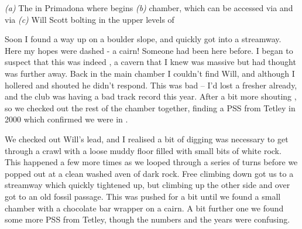 \begin{pagefigure}
	\checkoddpage \ifoddpage \forcerectofloat \else \forceversofloat \fi
	\centering
	
   	\begin{subfigure}[t]{0.49\textwidth}
    	\centering
       	\caption{} \label{The spiral climb}
    \end{subfigure}
    \hfill
	\begin{subfigure}[t]{0.49\textwidth}
		\centering
		 \caption{}\label{Alkatraz}
	\end{subfigure}
    \vspace{0cm}
	
	\begin{subfigure}[h]{\textwidth}
		\centering
		\caption{}\label{WS bolting}
	\end{subfigure}

         \caption{
   		\emph{(a)} The \protect{} in Primadona where \protect{} begins
     		\emph{(b)} \protect{} chamber, which can be accessed via \protect{} and \protect{} via \protect{}
     		\emph{(c)} Will Scott bolting in the upper levels of \protect{} 
		}
\end{pagefigure}

Soon I found a way up on a boulder slope, and quickly got into a streamway. Here my hopes were dashed - a cairn! Someone had been here before. I began to suspect that this was indeed , a cavern that I knew was massive but had thought was further away. Back in the main chamber I couldn't find Will, and although I hollered and shouted he didn't respond. This was bad -- I'd lost a fresher already, and the club was having a bad track record this year. After a bit more shouting , so we checked out the rest of the chamber together, finding a PSS from Tetley in 2000 which confirmed we were in .

We checked out Will's lead, and I realised a bit of digging was necessary to get through a crawl with a loose muddy floor filled with small bits of white rock. This happened a few more times as we looped through a series of turns before we popped out at a clean washed aven of dark rock. Free climbing down got us to a streamway which quickly tightened up, but climbing up the other side and over got to an old fossil passage. This was pushed for a bit until we found a small chamber with a chocolate bar wrapper on a cairn. A bit further one we found some more PSS from Tetley, though the numbers and the years were confusing.

